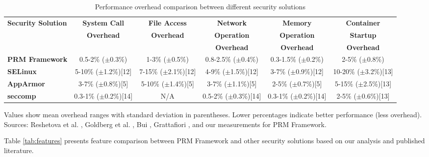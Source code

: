\begin{table}[htbp]
\caption{Performance overhead comparison between different security solutions}
\label{tab:performance}
\centering
\begin{tabular}{|l|c|c|c|c|c|}
\hline
\textbf{Security Solution} & \textbf{System Call} & \textbf{File Access} & \textbf{Network} & \textbf{Memory} & \textbf{Container} \\
 & \textbf{Overhead} & \textbf{Overhead} & \textbf{Operation} & \textbf{Operation} & \textbf{Startup} \\
 &  &  & \textbf{Overhead} & \textbf{Overhead} & \textbf{Overhead} \\
\hline
\textbf{PRM Framework} & 0.5-2\% ($\pm$0.3\%) & 1-3\% ($\pm$0.5\%) & 0.8-2.5\% ($\pm$0.4\%) & 0.3-1.5\% ($\pm$0.2\%) & 2-5\% ($\pm$0.8\%) \\
\hline
\textbf{SELinux} & 5-10\% ($\pm$1.2\%)[12] & 7-15\% ($\pm$2.1\%)[12] & 4-9\% ($\pm$1.5\%)[12] & 3-7\% ($\pm$0.9\%)[12] & 10-20\% ($\pm$3.2\%)[13] \\
\hline
\textbf{AppArmor} & 3-7\% ($\pm$0.8\%)[5] & 5-10\% ($\pm$1.4\%)[5] & 3-7\% ($\pm$1.1\%)[5] & 2-5\% ($\pm$0.7\%)[5] & 5-15\% ($\pm$2.5\%)[13] \\
\hline
\textbf{seccomp} & 0.3-1\% ($\pm$0.2\%)[14] & N/A & 0.5-2\% ($\pm$0.3\%)[14] & 0.3-1\% ($\pm$0.2\%)[14] & 2-5\% ($\pm$0.6\%)[13] \\
\hline
\end{tabular}
\begin{tablenotes}
\small
\item Values show mean overhead ranges with standard deviation in parentheses. Lower percentages indicate better performance (less overhead). Sources: Reshetova et al. \cite{reshetova2016security}, Goldberg et al. \cite{goldberg2019performance}, Bui \cite{bui2015analysis}, Grattafiori \cite{grattafiori2016understanding}, and our measurements for PRM Framework.
\end{tablenotes}
\end{table}

Table \ref{tab:features} presents feature comparison between PRM Framework and other security solutions based on our analysis and published literature.

